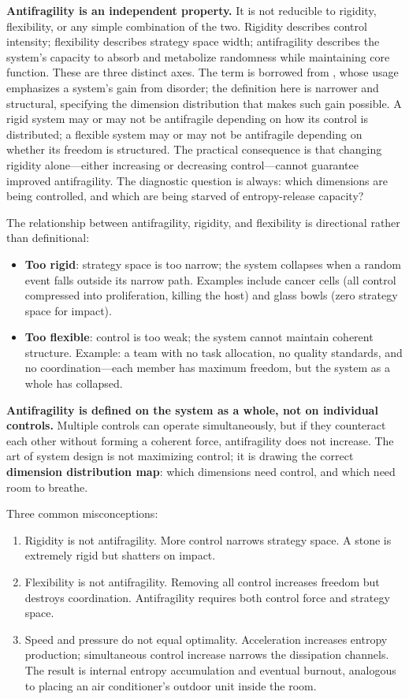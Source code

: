 \documentclass[11pt,a4paper]{article}
\begin{document}
\textbf{Antifragility is an independent property.} It is not reducible to rigidity, flexibility, or any simple combination of the two. Rigidity describes control intensity; flexibility describes strategy space width; antifragility describes the system's capacity to absorb and metabolize randomness while maintaining core function. These are three distinct axes. The term is borrowed from \citet{taleb2012}, whose usage emphasizes a system's gain from disorder; the definition here is narrower and structural, specifying the dimension distribution that makes such gain possible. A rigid system may or may not be antifragile depending on how its control is distributed; a flexible system may or may not be antifragile depending on whether its freedom is structured. The practical consequence is that changing rigidity alone---either increasing or decreasing control---cannot guarantee improved antifragility. The diagnostic question is always: which dimensions are being controlled, and which are being starved of entropy-release capacity?

The relationship between antifragility, rigidity, and flexibility is directional rather than definitional:

\begin{itemize}
    \item \textbf{Too rigid}: strategy space is too narrow; the system collapses when a random event falls outside its narrow path. Examples include cancer cells (all control compressed into proliferation, killing the host) and glass bowls (zero strategy space for impact).
    \item \textbf{Too flexible}: control is too weak; the system cannot maintain coherent structure. Example: a team with no task allocation, no quality standards, and no coordination---each member has maximum freedom, but the system as a whole has collapsed.
\end{itemize}

\textbf{Antifragility is defined on the system as a whole, not on individual controls.} Multiple controls can operate simultaneously, but if they counteract each other without forming a coherent force, antifragility does not increase. The art of system design is not maximizing control; it is drawing the correct \textbf{dimension distribution map}: which dimensions need control, and which need room to breathe.

Three common misconceptions:

\begin{enumerate}
    \item Rigidity is not antifragility. More control narrows strategy space. A stone is extremely rigid but shatters on impact.
    \item Flexibility is not antifragility. Removing all control increases freedom but destroys coordination. Antifragility requires both control force and strategy space.
    \item Speed and pressure do not equal optimality. Acceleration increases entropy production; simultaneous control increase narrows the dissipation channels. The result is internal entropy accumulation and eventual burnout, analogous to placing an air conditioner's outdoor unit inside the room.
\end{enumerate}
\end{document}
